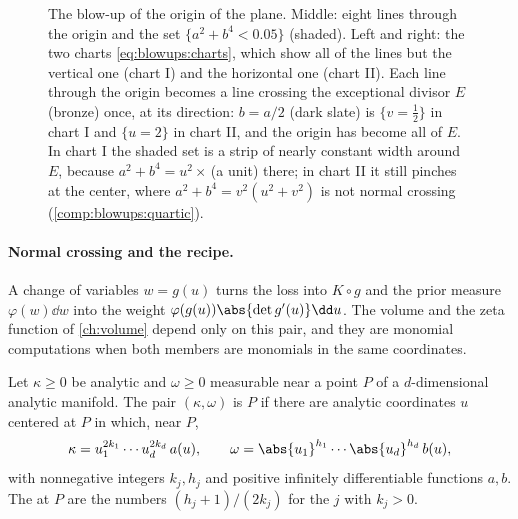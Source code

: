 \begin{refsection}
\begin{figure}[t]
\begin{fullwidth}
\end{fullwidth}
\caption{The blow-up of the origin of the plane. Middle: eight lines through the origin and the set $\{a^2+b^4<0.05\}$ (shaded). Left and right: the two charts \eqref{eq:blowups:charts}, which show all of the lines but the vertical one (chart I) and the horizontal one (chart II). Each line through the origin becomes a line crossing the exceptional divisor $E$ (bronze) once, at its direction: $b=a/2$ (dark slate) is $\{v=\frac12\}$ in chart I and $\{u=2\}$ in chart II, and the origin has become all of $E$. In chart I the shaded set is a strip of nearly constant width around $E$, because $a^2+b^4=u^2\times$\,(a unit) there; in chart II it still pinches at the center, where $a^2+b^4=v^2(u^2+v^2)$ is not normal crossing (\cref{comp:blowups:quartic}).}\label{fig:blowups:plane}
\end{figure}

\paragraph{Normal crossing and the recipe.} A change of variables $w=g(u)$ turns the loss into $K\circ g$ and the prior measure $\varphi(w)\dd w$ into the weight $\varphi(g(u))\abs{\det g'(u)}\dd u$. The volume and the zeta function of \cref{ch:volume} depend only on this pair, and they are monomial computations when both members are monomials in the same coordinates.

\begin{definition}\label{def:blowups:nc}
Let $\kappa\ge0$ be analytic and $\omega\ge0$ measurable near a point $P$ of a $d$-dimensional analytic manifold. The pair $(\kappa,\omega)$ is  $P$ if there are analytic coordinates $u$ centered at $P$ in which, near $P$,
\[
\kappa=u_1^{2k_1}\cdots u_d^{2k_d}\,a(u),\qquad\omega=\abs{u_1}^{h_1}\cdots\abs{u_d}^{h_d}\,b(u),
\]
with nonnegative integers $k_j,h_j$ and positive infinitely differentiable functions $a,b$. The  at $P$ are the numbers $(h_j+1)/(2k_j)$ for the $j$ with $k_j>0$.
\end{definition}


\end{refsection}
